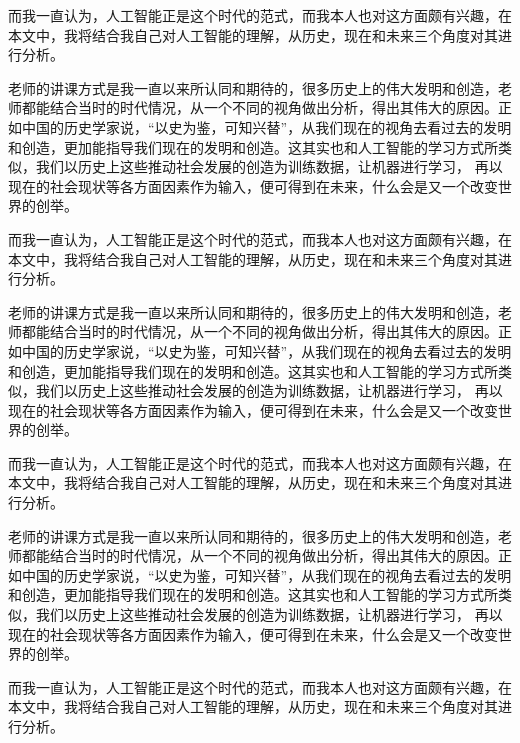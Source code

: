 \documentclass[UTF8]{XJTUthesis}
\begin{document}
而我一直认为，人工智能正是这个时代的范式，而我本人也对这方面颇有兴趣，在本文中，我将结合我自己对人工智能的理解，从历史，现在和未来三个角度对其进行分析。\par
老师的讲课方式是我一直以来所认同和期待的，很多历史上的伟大发明和创造，老师都能结合当时的时代情况，从一个不同的视角做出分析，得出其伟大的原因。正如中国的历史学家说，“以史为鉴，可知兴替”，从我们现在的视角去看过去的发明和创造，更加能指导我们现在的发明和创造。这其实也和人工智能的学习方式所类似，我们以历史上这些推动社会发展的创造为训练数据，让机器进行学习， 再以现在的社会现状等各方面因素作为输入，便可得到在未来，什么会是又一个改变世界的创举。\par
而我一直认为，人工智能正是这个时代的范式，而我本人也对这方面颇有兴趣，在本文中，我将结合我自己对人工智能的理解，从历史，现在和未来三个角度对其进行分析。\par
老师的讲课方式是我一直以来所认同和期待的，很多历史上的伟大发明和创造，老师都能结合当时的时代情况，从一个不同的视角做出分析，得出其伟大的原因。正如中国的历史学家说，“以史为鉴，可知兴替”，从我们现在的视角去看过去的发明和创造，更加能指导我们现在的发明和创造。这其实也和人工智能的学习方式所类似，我们以历史上这些推动社会发展的创造为训练数据，让机器进行学习， 再以现在的社会现状等各方面因素作为输入，便可得到在未来，什么会是又一个改变世界的创举。\par
而我一直认为，人工智能正是这个时代的范式，而我本人也对这方面颇有兴趣，在本文中，我将结合我自己对人工智能的理解，从历史，现在和未来三个角度对其进行分析。\par
老师的讲课方式是我一直以来所认同和期待的，很多历史上的伟大发明和创造，老师都能结合当时的时代情况，从一个不同的视角做出分析，得出其伟大的原因。正如中国的历史学家说，“以史为鉴，可知兴替”，从我们现在的视角去看过去的发明和创造，更加能指导我们现在的发明和创造。这其实也和人工智能的学习方式所类似，我们以历史上这些推动社会发展的创造为训练数据，让机器进行学习， 再以现在的社会现状等各方面因素作为输入，便可得到在未来，什么会是又一个改变世界的创举。\par
而我一直认为，人工智能正是这个时代的范式，而我本人也对这方面颇有兴趣，在本文中，我将结合我自己对人工智能的理解，从历史，现在和未来三个角度对其进行分析。\par
\end{document}
